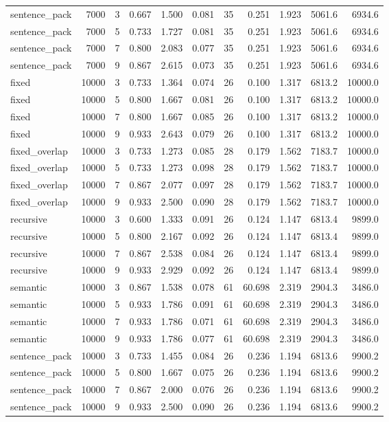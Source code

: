 \documentclass[pdflatex,sn-mathphys-num]{sn-jnl}
\theoremstyle{thmstyleone}
\theoremstyle{thmstyletwo}
\theoremstyle{thmstylethree}
\begin{document}
\begin{appendices}
\begin{table}
\begin{tabular}{@{}lrrrrrrrrrr@{}}
sentence\_pack & 7000 & 3 & 0.667 & 1.500 & 0.081 & 35 & 0.251 & 1.923 & 5061.6 & 6934.6 \\
sentence\_pack & 7000 & 5 & 0.733 & 1.727 & 0.081 & 35 & 0.251 & 1.923 & 5061.6 & 6934.6 \\
sentence\_pack & 7000 & 7 & 0.800 & 2.083 & 0.077 & 35 & 0.251 & 1.923 & 5061.6 & 6934.6 \\
sentence\_pack & 7000 & 9 & 0.867 & 2.615 & 0.073 & 35 & 0.251 & 1.923 & 5061.6 & 6934.6 \\
fixed & 10000 & 3 & 0.733 & 1.364 & 0.074 & 26 & 0.100 & 1.317 & 6813.2 & 10000.0 \\
fixed & 10000 & 5 & 0.800 & 1.667 & 0.081 & 26 & 0.100 & 1.317 & 6813.2 & 10000.0 \\
fixed & 10000 & 7 & 0.800 & 1.667 & 0.085 & 26 & 0.100 & 1.317 & 6813.2 & 10000.0 \\
fixed & 10000 & 9 & 0.933 & 2.643 & 0.079 & 26 & 0.100 & 1.317 & 6813.2 & 10000.0 \\
fixed\_overlap & 10000 & 3 & 0.733 & 1.273 & 0.085 & 28 & 0.179 & 1.562 & 7183.7 & 10000.0 \\
fixed\_overlap & 10000 & 5 & 0.733 & 1.273 & 0.098 & 28 & 0.179 & 1.562 & 7183.7 & 10000.0 \\
fixed\_overlap & 10000 & 7 & 0.867 & 2.077 & 0.097 & 28 & 0.179 & 1.562 & 7183.7 & 10000.0 \\
fixed\_overlap & 10000 & 9 & 0.933 & 2.500 & 0.090 & 28 & 0.179 & 1.562 & 7183.7 & 10000.0 \\
recursive & 10000 & 3 & 0.600 & 1.333 & 0.091 & 26 & 0.124 & 1.147 & 6813.4 & 9899.0 \\
recursive & 10000 & 5 & 0.800 & 2.167 & 0.092 & 26 & 0.124 & 1.147 & 6813.4 & 9899.0 \\
recursive & 10000 & 7 & 0.867 & 2.538 & 0.084 & 26 & 0.124 & 1.147 & 6813.4 & 9899.0 \\
recursive & 10000 & 9 & 0.933 & 2.929 & 0.092 & 26 & 0.124 & 1.147 & 6813.4 & 9899.0 \\
semantic & 10000 & 3 & 0.867 & 1.538 & 0.078 & 61 & 60.698 & 2.319 & 2904.3 & 3486.0 \\
semantic & 10000 & 5 & 0.933 & 1.786 & 0.091 & 61 & 60.698 & 2.319 & 2904.3 & 3486.0 \\
semantic & 10000 & 7 & 0.933 & 1.786 & 0.071 & 61 & 60.698 & 2.319 & 2904.3 & 3486.0 \\
semantic & 10000 & 9 & 0.933 & 1.786 & 0.077 & 61 & 60.698 & 2.319 & 2904.3 & 3486.0 \\
sentence\_pack & 10000 & 3 & 0.733 & 1.455 & 0.084 & 26 & 0.236 & 1.194 & 6813.6 & 9900.2 \\
sentence\_pack & 10000 & 5 & 0.800 & 1.667 & 0.075 & 26 & 0.236 & 1.194 & 6813.6 & 9900.2 \\
sentence\_pack & 10000 & 7 & 0.867 & 2.000 & 0.076 & 26 & 0.236 & 1.194 & 6813.6 & 9900.2 \\
sentence\_pack & 10000 & 9 & 0.933 & 2.500 & 0.090 & 26 & 0.236 & 1.194 & 6813.6 & 9900.2 \\


\end{tabular}
\end{table}
\end{appendices}
\end{document}
